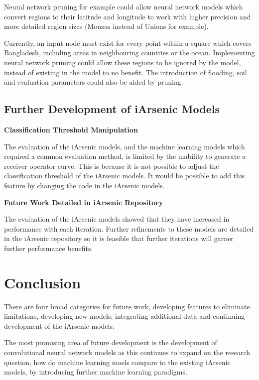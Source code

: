 Neural network pruning for example could allow neural network models which convert regions to their latitude and longitude to work with higher precision and more detailed region sizes (Mouzas instead of Unions for example). 

Currently, an input node must exist for every point within a square which covers Bangladesh, including areas in neighbouring countries or the ocean. Implementing neural network pruning could allow these regions to be ignored by the model, instead of existing in the model to no benefit. The introduction of flooding, soil and evaluation parameters could also be aided by pruning.

\subsection{Further Development of iArsenic Models}

\textbf{Classification Threshold Manipulation}

The evaluation of the iArsenic models, and the machine learning models which required a common evaluation method, is limited by the inability to generate a receiver operator curve. This is because it is not possible to adjust the classification threshold of the iArsenic models. It would be possible to add this feature by changing the code in the iArsenic models.

\textbf{Future Work Detailed in iArsenic Repository}

The evaluation of the iArsenic models showed that they have increased in performance with each iteration. Further refinements to these models are detailed in the iArsenic repository so it is feasible that further iterations will garner further performance benefits.

\section{Conclusion}

There are four broad categories for future work, developing features to eliminate limitations, developing new models, integrating additional data and continuing development of the iArsenic models.

The most promising area of future development is the development of convolutional neural network models as this continues to expand on the research question, how do machine learning moels compare to the existing iArsenic models, by introducing further machine learning paradigms.